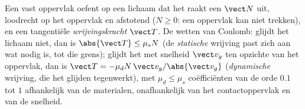 \begin{proposition}\label{prop:b1:newton-dynamics:friction}
Een vast oppervlak oefent op een lichaam dat het raakt een \emph{}
$\vect N$ uit, loodrecht op het oppervlak en afstotend ($N \geq 0$: een
oppervlak kan niet trekken), en een tangentiële \emph{wrijvingskracht} $\vect T$.
De wetten van Coulomb: glijdt het lichaam niet, dan is $\abs{\vect T} \leq \mu_s N$
(de \emph{statische} wrijving past zich aan wat nodig is, tot die grens);
glijdt het met snelheid $\vect v_g$ ten opzichte van het oppervlak, dan is
$\vect T = -\mu_d N\,\vect v_g/\abs{\vect v_g}$ (\emph{dynamische} wrijving,
die het glijden tegenwerkt), met $\mu_d \leq \mu_s$ coëfficiënten van de orde
$0.1$ tot $1$ afhankelijk van de materialen, onafhankelijk van het contactoppervlak
en van de snelheid.
\end{proposition}
\admitted

